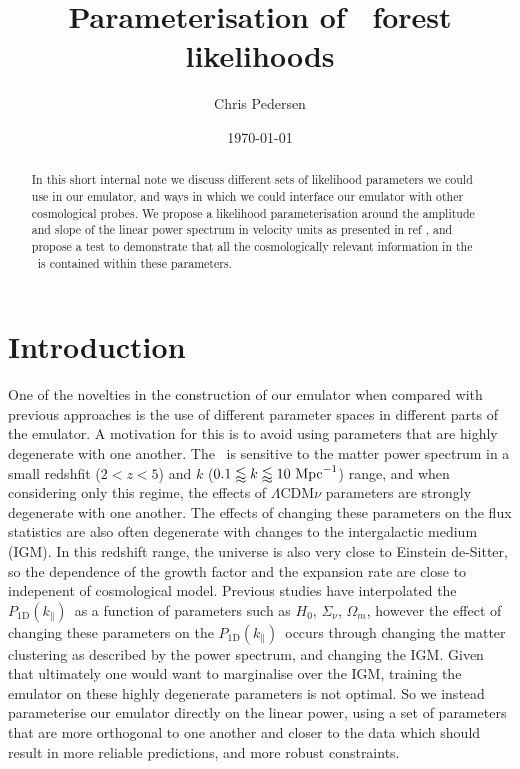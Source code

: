 \documentclass[preprintnumbers,prd,superscriptaddress,notitlepage,nofootinbib] {revtex4-1}
\newcommand{\fluxpower}{$P_\mathrm{1D}(k_\parallel)$}
\begin{document}
\title{Parameterisation of \lya\ forest likelihoods}

\author{Chris Pedersen} %

\date{\today}

\begin{abstract}
In this short internal note we discuss different sets of likelihood parameters
we could use in our emulator, and ways in which we could interface our emulator
with other cosmological probes. We propose a likelihood parameterisation around
the amplitude and slope of the linear power spectrum in velocity units as
presented in ref \cite{McDonald2005a}, and propose a test to demonstrate that
all the cosmologically relevant information in the \lyaf\ is contained within
these parameters.
\end{abstract}

\maketitle

\section{Introduction}
One of the novelties in the construction of our emulator when compared with
previous approaches is the use of different parameter spaces in different parts
of the emulator. A motivation for this is to avoid using parameters that are
highly degenerate with one another. The \lyaf\ is
sensitive to the matter power spectrum in a small redshfit ($2<z<5$) and
$k$ ($0.1\lessapprox k \lessapprox 10 \ \text{Mpc}^{-1} $) range, and when considering only
this regime, the effects of $\Lambda$CDM$\nu$ parameters are strongly degenerate with
one another\cite{Pedersen2020}. The effects of changing these parameters on the flux statistics are also
often degenerate with changes to the intergalactic medium (IGM). In this redshift
range, the universe is also very close to Einstein de-Sitter, so the dependence of the
growth factor and the expansion rate are close to indepenent of cosmological model.
Previous studies have interpolated the \fluxpower\ as a function of parameters
such as $H_0$, $\Sigma_\nu$, $\Omega_m$\cite{Yeche2017},
however the effect of changing these
parameters on the \fluxpower\ occurs through changing the matter clustering
as described by the power spectrum, and changing the IGM.
Given that ultimately one would want to marginalise over the IGM,
training the emulator on these highly degenerate parameters is not
optimal.
So we instead parameterise our emulator directly on the linear power, using a set of
parameters that are more orthogonal to one another and closer to the data which should
result in more reliable predictions, and more robust constraints.
\end{document}
